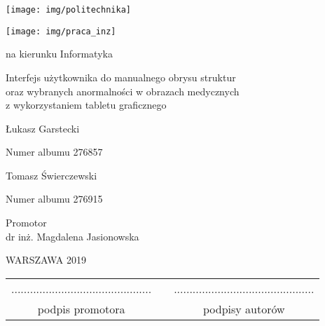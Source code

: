 \documentclass[12pt,twoside,a4paper]{article}
\newcommand{\discipline}{Informatyka}
\renewcommand{\title}{Interfejs użytkownika do manualnego obrysu struktur\\oraz wybranych anormalności w obrazach medycznych\\z wykorzystaniem tabletu graficznego}
\newcommand{\supervisor}{dr inż. Magdalena Jasionowska}
\renewcommand{\year}{2019}
\newcommand{\authori}{Łukasz Garstecki}
\newcommand{\albumi}{276857}
\newcommand{\authorii}{Tomasz Świerczewski}
\newcommand{\albumii}{276915}
\begin{document}
\pagestyle{empty}

\begin{center}

\texttt{[image: img/politechnika]} 
\vspace{40pt}

\texttt{[image: img/praca\_inz]}  %

{ \arial na kierunku \discipline

\vspace{30pt}
{\arial \large \title}

\vspace{40pt}

{\arial \huge \authori }

\vspace{5pt}

Numer albumu \albumi

\vspace {20pt}
{\arial \huge \authorii}

\vspace{5pt}

Numer albumu \albumii

\vspace{40pt}

Promotor \\
{\arial \supervisor}

\vspace{15pt}

 \vfill
WARSZAWA \year \\
}
\end{center}


\newpage
\null

\vfill

\begin{center}
\begin{tabular}[t]{ccc}
............................................. & \hspace*{100pt} & .............................................\\
podpis promotora & \hspace*{100pt} & podpisy autorów
\end{tabular}
\end{center}
\end{document}
